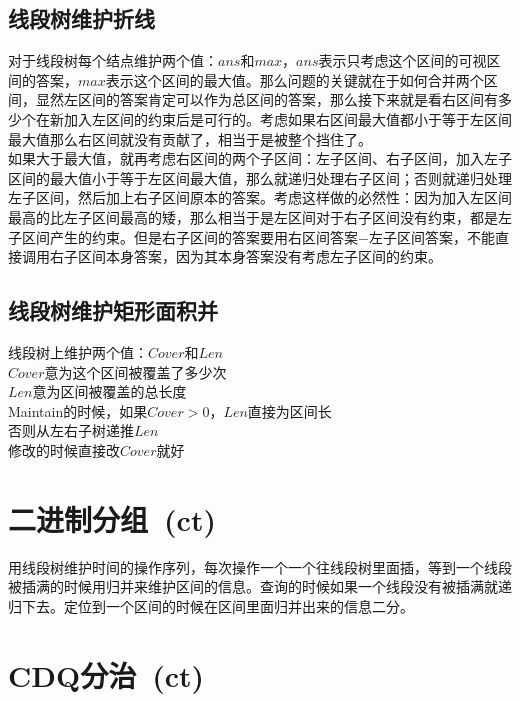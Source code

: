 	\subsection*{线段树维护折线}
		对于线段树每个结点维护两个值：$ ans $和$ max $，$ ans $表示只考虑这个区间的可视区间的答案，$ max $表示这个区间的最大值。那么问题的关键就在于如何合并两个区间，显然左区间的答案肯定可以作为总区间的答案，那么接下来就是看右区间有多少个在新加入左区间的约束后是可行的。考虑如果右区间最大值都小于等于左区间最大值那么右区间就没有贡献了，相当于是被整个挡住了。
		\\如果大于最大值，就再考虑右区间的两个子区间：左子区间、右子区间，加入左子区间的最大值小于等于左区间最大值，那么就递归处理右子区间；否则就递归处理左子区间，然后加上右子区间原本的答案。考虑这样做的必然性：因为加入左区间最高的比左子区间最高的矮，那么相当于是左区间对于右子区间没有约束，都是左子区间产生的约束。但是右子区间的答案要用右区间答案$ - $左子区间答案，不能直接调用右子区间本身答案，因为其本身答案没有考虑左子区间的约束。
	\subsection*{线段树维护矩形面积并}
		线段树上维护两个值：$ Cover $和$ Len $
		\\$ Cover $意为这个区间被覆盖了多少次
		\\$ Len $意为区间被覆盖的总长度
		\\Maintain的时候，如果$ Cover > 0 $，$ Len $直接为区间长
		\\否则从左右子树递推$ Len $
		\\修改的时候直接改$ Cover $就好
\section{二进制分组\ \small(ct)}
	用线段树维护时间的操作序列，每次操作一个一个往线段树里面插，等到一个线段被插满的时候用归并来维护区间的信息。查询的时候如果一个线段没有被插满就递归下去。定位到一个区间的时候在区间里面归并出来的信息二分。
\section{CDQ分治\ \small(ct)}
